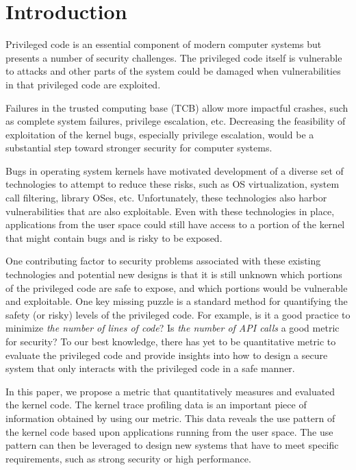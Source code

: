 \section{Introduction}
\label{sec.introduction}

Privileged code is an essential component of modern computer systems but 
presents a number of security challenges. The privileged code itself is vulnerable 
to attacks and other parts of the system could be damaged when vulnerabilities in 
that privileged code are exploited.

Failures in the trusted computing base (TCB) allow more impactful crashes, 
such as complete system failures, privilege escalation, etc. 
Decreasing the feasibility of exploitation of the kernel bugs, especially privilege escalation, 
would be a substantial step toward stronger security for computer systems.

Bugs in operating system kernels have motivated development of a diverse set of
technologies to attempt to reduce these risks, such as OS virtualization, system
call filtering, library OSes, etc. Unfortunately, these technologies also 
harbor vulnerabilities that are also exploitable. Even with these technologies in place,
applications from the user space could still have access to a portion of the kernel that might contain 
bugs and is risky to be exposed. 

One contributing factor to security problems associated with these existing technologies and potential
new designs is that it is still unknown which portions of the privileged code are
safe to expose, and which portions would be vulnerable and exploitable. 
One key missing puzzle is a standard method for quantifying the safety (or risky) levels of the privileged code. 
For example, is it a good practice to minimize \textit{the number of lines of code}?
Is \textit{the number of API calls} a good metric for security? 
To our best knowledge, there has yet to be quantitative metric to evaluate the privileged code and provide 
insights into how to design a secure system that only interacts with the privileged code in a safe manner.

In this paper, we propose a metric that quantitatively measures and evaluated the 
kernel code. The kernel trace profiling data is an important piece of information 
obtained by using our metric. This data reveals the use pattern of the kernel code 
based upon applications running from the user space. The use pattern can then be
leveraged to design new systems that have to meet specific requirements, 
such as strong security or high performance.

